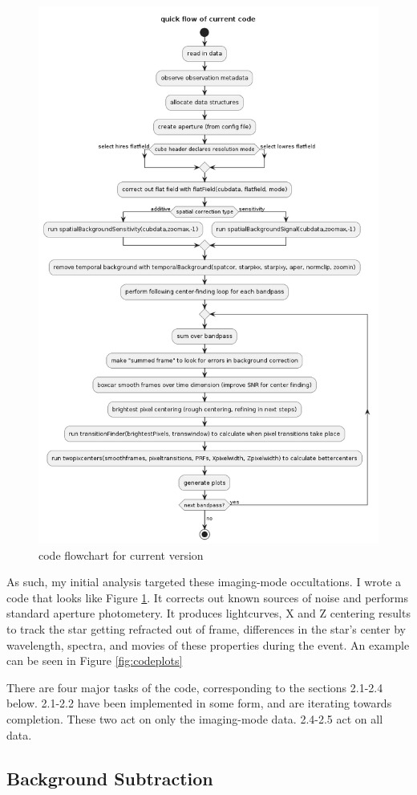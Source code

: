 \documentclass[12pt]{article}
\begin{document}
\begin{figure}[h!]
  \centering
  \includegraphics[width=0.7\linewidth]{codeflow.png}
  \caption{code flowchart for current version}
  \label{fig:codeoverview}
\end{figure}

As such, my initial analysis targeted these imaging-mode occultations.  I wrote
a code that looks like Figure \ref{fig:codeoverview}. It corrects out known
sources of noise and performs standard aperture photometery. It produces
lightcurves, X and Z centering results to track the star getting refracted out
of frame, differences in the star's center by wavelength, spectra, and movies
of these properties during the event. An example can be seen in Figure \ref{fig:codeplots}

There are four major tasks of the code, corresponding to the sections 2.1-2.4
below. 2.1-2.2 have been implemented in some form, and are iterating towards
completion. These two act on only the imaging-mode data. 2.4-2.5 act on all
data.

\subsection{Background Subtraction}
\end{document}
